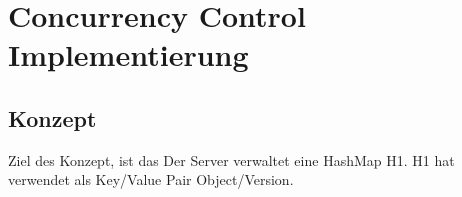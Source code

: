 
\section{Concurrency Control Implementierung }
\label{sec:conc-contr-impl}


\subsection{Konzept}
\label{sec:konzept}

Ziel des Konzept, ist das  
Der Server verwaltet eine HashMap H1. H1 hat verwendet als Key/Value Pair Object/Version. 